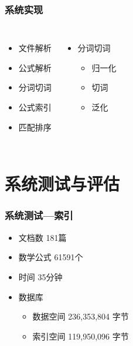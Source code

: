     \begin{frame}
        \frametitle{系统实现}
        \begin{columns}
                \begin{itemize}
                    \item 文件解析
                    \item 公式解析
                    \item 分词切词
                    \item 公式索引
                    \item 匹配排序
                \end{itemize}
                \begin{itemize}
                    \item 分词切词
                    \begin{itemize}
                        \item 归一化
                        \item 切词
                        \item 泛化
                    \end{itemize}
                \end{itemize}
        \end{columns}
    \end{frame}
    
    \section{系统测试与评估}
    
    \begin{frame}
        \frametitle{系统测试---索引}
        \begin{itemize}
            \item 文档数 181篇
            \item 数学公式 61591个
            \item 时间 35分钟
            \item 数据库
            \begin{itemize}
                \item 数据空间 236,353,804 字节
                \item 索引空间 119,950,096 字节
            \end{itemize}
        \end{itemize}
    \end{frame}

